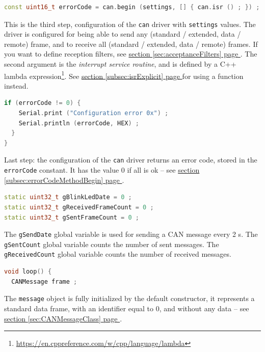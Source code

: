 \documentclass[10pt, a4paper, obeyspaces]{extarticle}
\newcommand\refSectionPage[1]{\hyperref[sec:#1]{section \ref*{sec:#1} page \pageref{sec:#1}}}
\newcommand\refSubsectionPage[1]{\hyperref[subsec:#1]{section \ref*{subsec:#1} page \pageref{subsec:#1}}}
\begin{document}
{ \small\begin{lstlisting}[language=c++]
  const uint16_t errorCode = can.begin (settings, [] { can.isr () ; }) ;
\end{lstlisting}}
This is the third step, configuration of the \texttt{can} driver with \texttt{settings} values. The driver is configured for being able to send any (standard / extended, data / remote) frame, and to receive all (standard / extended, data / remote) frames. If you want to define reception filters, see \refSectionPage{acceptanceFilters}. The second argument is the \emph{interrupt service routine}, and is defined by a C++ lambda expression\footnote{\url{https://en.cppreference.com/w/cpp/language/lambda}}. See \refSubsectionPage{isrExplicit} for using a function instead.





{ \small\begin{lstlisting}[language=c++]
  if (errorCode != 0) {
    Serial.print ("Configuration error 0x") ;
    Serial.println (errorCode, HEX) ;
  }
}
\end{lstlisting}}
Last step: the configuration of the \texttt{can} driver returns an error code, stored in the \texttt{errorCode} constant. It has the value $0$ if all is ok -- see \refSubsectionPage{errorCodeMethodBegin}.








{ \small\begin{lstlisting}[language=c++]
static uint32_t gBlinkLedDate = 0 ;
static uint32_t gReceivedFrameCount = 0 ;
static uint32_t gSentFrameCount = 0 ;
\end{lstlisting}}
The \texttt{gSendDate} global variable is used for sending a CAN message every 2 s. The \texttt{gSentCount} global variable counts the number of sent messages. The \texttt{gReceivedCount} global variable counts the number of received messages.



{ \small\begin{lstlisting}[language=c++]
void loop() {
  CANMessage frame ;
\end{lstlisting}}
The \texttt{message} object is fully initialized by the default constructor, it represents a standard data frame, with an identifier equal to $0$, and without any data -- see \refSectionPage{CANMessageClass}. 
\end{document}
